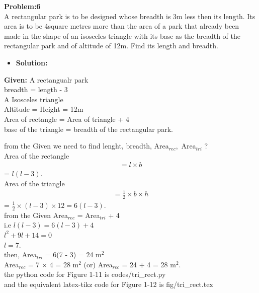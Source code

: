 \begin{frame}
{\textbf{Problem:6}\\A rectangular park is to be designed whose breadth is 3m less then its length. Its area is to be 4square metres more than the area of a park that already been made in the shape of an isosceles triangle with its base as the breadth of the rectangular park and of altitude of 12m. Find its length and breadth.}
\begin{itemize}
\item \textbf{Solution:}
\end{itemize}
\textbf{Given:} A rectangualr park \\
breadth = length - 3\\
A Isosceles triangle\\
Altitude = Height = 12m\\
Area of rectangle = Area of triangle + 4\\
base of the triangle = breadth of the rectangular  park.\\
\end{frame}
\begin{frame}
from the Given we need to find  lenght, breadth, Area$_{rec},$ Area$_{tri}$ ?\\
 Area of the rectangle
\begin{align}
 = l \times b
 \end{align}
= $l(l - 3).$\\
Area of the triangle
\begin{align}
 = \frac{1}{2} \times b \times h
\end{align}
 = $\frac{1}{2} \times (l -3)\times 12 = 6(l - 3).$\\
from the Given Area$_{rec}$ = Area$_{tri}$ + 4\\
i.e \enspace
$l(l - 3) = 6(l - 3) + 4$\\
$l^2 + 9l + 14 = 0$ \\
$l = 7.$\\
then, Area$_{tri}$ = 6(7 - 3) = 24 m$^2$\\
Area$_{rec}$ = 7 $\times$ 4 = 28 m$^2$ (or) Area$_{rec}$ =  24 + 4 = 28 m$^2.$\\
the python code for  Figure 1-11 is codes/tri\_rect.py\\
and the equivalent latex-tikz code for Figure 1-12 is fig/tri\_rect.tex
\end{frame}

